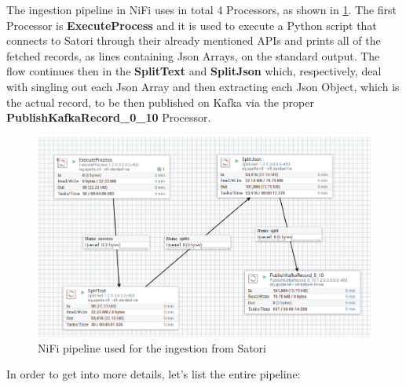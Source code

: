 The ingestion pipeline in NiFi uses in total 4 Processors, as shown in \ref{fig:nifipipeline}. The first Processor is \textbf{ExecuteProcess} and it is used to execute a Python script that connects to Satori through their already mentioned APIs and prints all of the fetched records, as lines containing Json Arrays, on the standard output. The flow continues then in the \textbf{SplitText} and \textbf{SplitJson} which, respectively, deal with singling out each Json Array and then extracting each Json Object, which is the actual record, to be then published on Kafka via the proper \textbf{PublishKafkaRecord\_0\_10} Processor.

\begin{figure}[ph]
    \centering
    \includegraphics[width=0.7\linewidth]{Figures/nifipipeline}
    \caption{NiFi pipeline used for the ingestion from Satori}
    \label{fig:nifipipeline}
\end{figure}

In order to get into more details, let's list the entire pipeline:

